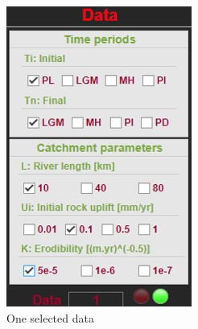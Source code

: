 \documentclass[11pt,a4paper,titlepage]{report}
\begin{document}
\begin{figure}[H]
\begin{subfigure}[H]{0.2\textwidth}
        \includegraphics[width=\textwidth]{data2.jpg}
        \caption{One selected data}
    \end{subfigure}
    \quad
    \begin{subfigure}[H]{0.2\textwidth}

\end{subfigure}
\end{figure}
\end{document}

